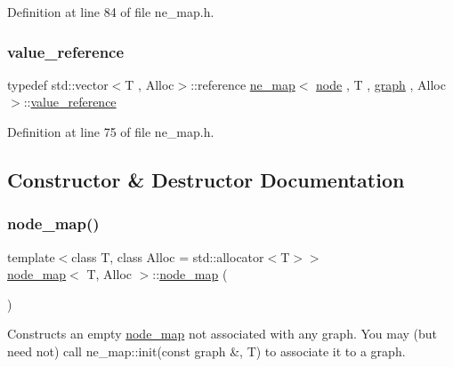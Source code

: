 Definition at line 84 of file ne\+\_\+map.\+h.

\mbox{\label{classne__map_a3de60750d102f8992a215b0fe645014d}} 
\subsubsection{\texorpdfstring{value\+\_\+reference}{value\_reference}}
{\footnotesize\ttfamily typedef std\+::vector$<$T , Alloc$>$\+::reference \mbox{\hyperlink{classne__map}{ne\+\_\+map}}$<$ \mbox{\hyperlink{classnode}{node}} , T , \mbox{\hyperlink{classgraph}{graph}} , Alloc $>$\+::\mbox{\hyperlink{classne__map_a3de60750d102f8992a215b0fe645014d}{value\+\_\+reference}}\hspace{0.3cm}{\ttfamily [inherited]}}



Definition at line 75 of file ne\+\_\+map.\+h.



\subsection{Constructor \& Destructor Documentation}
\mbox{\label{classnode__map_a7a4c767f07f348d31a1004776485d17b}} 
\subsubsection{\texorpdfstring{node\+\_\+map()}{node\_map()}\hspace{0.1cm}{\footnotesize\ttfamily [1/2]}}
{\footnotesize\ttfamily template$<$class T, class Alloc = std\+::allocator$<$\+T$>$$>$ \\
\mbox{\hyperlink{classnode__map}{node\+\_\+map}}$<$ T, Alloc $>$\+::\mbox{\hyperlink{classnode__map}{node\+\_\+map}} (\begin{DoxyParamCaption}{ }\end{DoxyParamCaption})\hspace{0.3cm}{\ttfamily [inline]}}

Constructs an empty {\ttfamily \mbox{\hyperlink{classnode__map}{node\+\_\+map}}} not associated with any {\ttfamily graph}. You may (but need not) call {\ttfamily ne\+\_\+map\+::init(const graph \&, T)} to associate it to a {\ttfamily graph}. 

